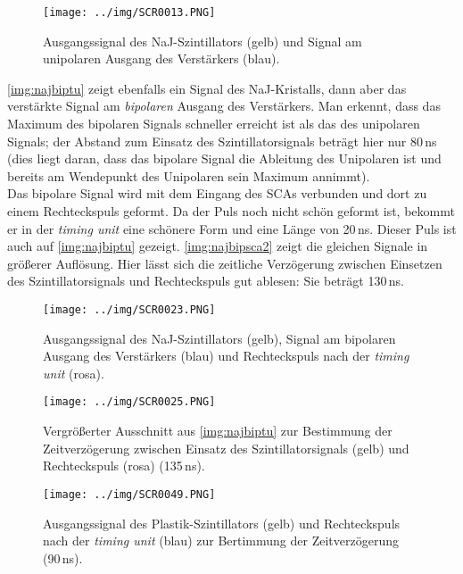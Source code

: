 \begin{figure}[H]
\begin{center}
  \texttt{[image: ../img/SCR0013.PNG]}
  \caption[---]{Ausgangssignal des NaJ-Szintillators (gelb) und Signal am unipolaren Ausgang des Verstärkers (blau).}
  \label{img:najunip}
\end{center}
\end{figure}

\autoref{img:najbiptu} zeigt ebenfalls ein Signal des NaJ-Kristalls,
dann aber das verstärkte Signal am \emph{bipolaren} Ausgang des Verstärkers.
Man erkennt, dass das Maximum des bipolaren Signals schneller erreicht ist als das des unipolaren Signals;
der Abstand zum Einsatz des Szintillatorsignals beträgt hier nur 80\,ns (dies liegt daran,
dass das bipolare Signal die Ableitung des Unipolaren ist und bereits am Wendepunkt des Unipolaren sein Maximum
annimmt).\\
Das bipolare Signal wird mit dem Eingang des SCAs verbunden und dort zu einem Rechteckspuls geformt.
Da der Puls noch nicht schön geformt ist, bekommt er in der \emph{timing unit} eine schönere Form und eine Länge von
20\,ns. Dieser Puls ist auch auf \autoref{img:najbiptu} gezeigt.
\autoref{img:najbipsca2} zeigt die gleichen Signale in größerer Auflösung.
Hier lässt sich die zeitliche Verzögerung zwischen Einsetzen des Szintillatorsignals und Rechteckspuls
gut ablesen: Sie beträgt 130\,ns.

\begin{figure}[H]
\begin{center}
  \texttt{[image: ../img/SCR0023.PNG]}
  \caption[---]{Ausgangssignal des NaJ-Szintillators (gelb),
  Signal am bipolaren Ausgang des Verstärkers (blau)
  und Rechteckspuls nach der \emph{timing unit} (rosa).}
  \label{img:najbiptu}
\end{center}
\end{figure}

\begin{figure}[H]
\begin{center}
  \texttt{[image: ../img/SCR0025.PNG]}
  \caption[---]{Vergrößerter Ausschnitt aus \autoref{img:najbiptu} zur Bestimmung der Zeitverzögerung zwischen
  Einsatz des Szintillatorsignals (gelb) und Rechteckspuls (rosa) (135\,ns).}
  \label{img:najbipsca2}
\end{center}
\end{figure}

\begin{figure}[H]
\begin{center}
  \texttt{[image: ../img/SCR0049.PNG]}
  \caption[---]{Ausgangssignal des Plastik-Szintillators (gelb) und
  Rechteckspuls nach der \emph{timing unit} (blau) zur Bertimmung der Zeitverzögerung (90\,ns).}
  \label{img:plastiktu}
\end{center}
\end{figure}


